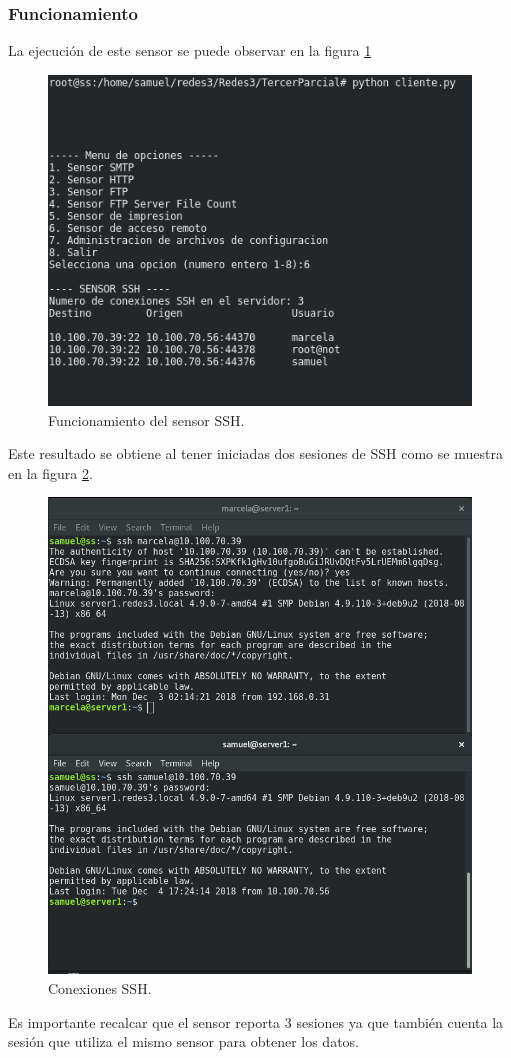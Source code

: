 \subsubsection{Funcionamiento}
La ejecución de este sensor se puede observar en la figura \ref{image:sensorsshfunc}

\FloatBarrier
\begin{figure}[htbp!]
		\centering
			\includegraphics[width=.55 \textwidth]{images/sensorsshfunc}
		\caption{Funcionamiento del sensor SSH.}
		\label{image:sensorsshfunc}
\end{figure}
\FloatBarrier

Este resultado se obtiene al tener iniciadas dos sesiones de SSH como se muestra en la figura \ref{image:sshconn}.

\FloatBarrier
\begin{figure}[htbp!]
		\centering
			\includegraphics[width=.55 \textwidth]{images/sshconn}
		\caption{Conexiones SSH.}
		\label{image:sshconn}
\end{figure}
\FloatBarrier

Es importante recalcar que el sensor reporta 3 sesiones ya que también cuenta la sesión que utiliza el mismo sensor para obtener los datos.